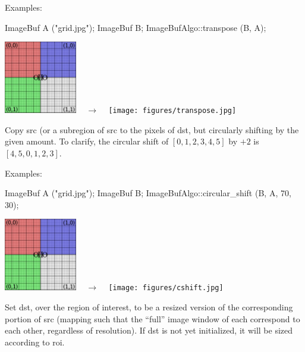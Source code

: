 \smallskip
\noindent Examples:
\begin{code}
    ImageBuf A ("grid.jpg");
    ImageBuf B;
    ImageBufAlgo::transpose (B, A);
\end{code}
\spc \includegraphics[width=1.25in]{figures/grid-small.jpg} 
~ {\Huge $\rightarrow$} ~
\texttt{[image: figures/transpose.jpg]} \\
\apiend


 

Copy {\cf src} (or a subregion of {\cf src} to the pixels of {\cf dst},
but circularly shifting by the given amount.  To clarify, the circular
shift of $[0,1,2,3,4,5]$ by $+2$ is $[4,5,0,1,2,3]$.

\smallskip
\noindent Examples:
\begin{code}
    ImageBuf A ("grid.jpg");
    ImageBuf B;
    ImageBufAlgo::circular_shift (B, A, 70, 30);
\end{code}
\spc \includegraphics[width=1.25in]{figures/grid-small.jpg} 
~ {\Huge $\rightarrow$} ~
\texttt{[image: figures/cshift.jpg]} \\
\apiend


 
Set {\cf dst}, over the region of interest, to be a resized version of the
corresponding portion of {\cf src} (mapping such that the ``full'' image
window of each correspond to each other, regardless of resolution).  If
{\cf dst} is not yet initialized, it will be sized according to {\cf roi}.

